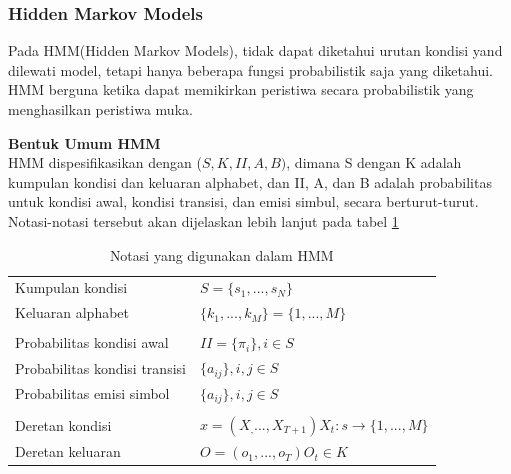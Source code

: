 \subsubsection{Hidden Markov Models}
\label{sec:hidden-markov-models}
Pada HMM(Hidden Markov Models), tidak dapat diketahui urutan kondisi yand dilewati model, tetapi hanya beberapa fungsi probabilistik saja yang diketahui. HMM berguna ketika dapat memikirkan peristiwa secara probabilistik yang menghasilkan peristiwa muka. 

\textbf{Bentuk Umum HMM}\\
HMM dispesifikasikan dengan (\(S,K,II,A,B)\), dimana S dengan K adalah kumpulan kondisi dan keluaran alphabet, dan II, A, dan B adalah probabilitas untuk kondisi awal, kondisi transisi, dan emisi simbul, secara berturut-turut. Notasi-notasi tersebut akan dijelaskan lebih lanjut pada tabel \ref{tab:hmm-notation}

\begin{table}%
	\centering
\begin{tabular}{l l}
Kumpulan kondisi  & \(S=\{ s_1,...,s_N\}\)\\
Keluaran alphabet	& \(\{k_1,...,k_M\} = \{1,...,M\}\)\\
\\
Probabilitas kondisi awal & \(II = \{\pi_i\}, i\in S\)\\
Probabilitas kondisi transisi & \(\{a_{ij}\},i,j\in S\)\\
Probabilitas emisi simbol & \(\{a_{ij}\},i,j\in S\)\\
\\
Deretan kondisi	& \(x= (X_,...,X_{T+1}) X_t : s \stackrel{}{\rightarrow} \{1,...,M\}\)\\
Deretan keluaran & \(O= (o_1,...,o_T) O_t \in K\)
\end{tabular}
\caption{Notasi yang digunakan dalam HMM}
\label{tab:hmm-notation}
\end{table}


